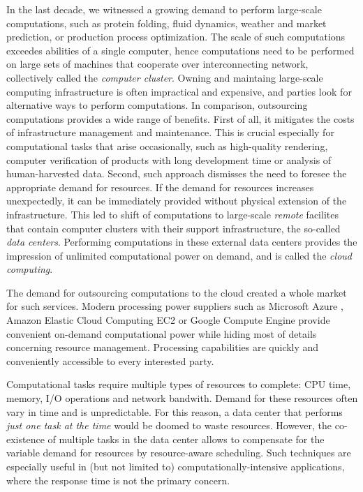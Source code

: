 \indent
In the last decade, we witnessed a growing demand to perform large-scale
computations, such as protein folding, fluid dynamics, weather and market prediction, or production process optimization.
The scale of such computations exceedes abilities of a single computer, hence computations need to be performed on large sets of machines that cooperate over interconnecting network, collectively called the \emph{computer cluster}.
Owning and maintaing large-scale computing infrastructure is often impractical and expensive, and parties look for alternative ways to perform computations.
In comparison, outsourcing computations provides a wide range of benefits.
First of all, it mitigates the costs of infrastructure management and maintenance.
This is crucial especially for computational tasks that arise occasionally, such as high-quality rendering, computer verification of products with long development time or analysis of human-harvested data.
Second, such approach dismisses the need to foresee the appropriate demand for resources.
If the demand for resources increases unexpectedly, it can be immediately provided without physical extension of the infrastructure.
This led to shift of computations to large-scale \emph{remote} facilites that contain computer clusters with their support infrastructure, the so-called \emph{data centers}.
Performing computations in these external data centers provides the impression of unlimited computational power on demand, and is called the \emph{cloud computing}.

The demand for outsourcing computations to the cloud created a whole market for such services.
Modern processing power suppliers such as Microsoft Azure \cite{url-azure}, Amazon Elastic Cloud Computing EC2 \cite{url-amazon-ec2} or Google Compute Engine \cite{url-gce} provide convenient on-demand computational power while hiding most of details concerning resource management.
Processing capabilities are quickly and conveniently accessible to every interested party.

Computational tasks require multiple types of resources to complete: CPU time, memory, I/O operations and network bandwith.
Demand for these resources often vary in time and is unpredictable.
For this reason, a data center that performs \emph{just one task at the time} would be doomed to waste resources.
However, the co-existence of multiple tasks in the data center allows to compensate for the variable demand for resources by resource-aware scheduling.
Such techniques are especially useful in (but not limited to) computationally-intensive applications, where the response time is not the primary concern.

